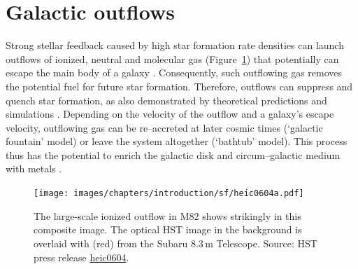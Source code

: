 
\section{Galactic outflows}
\label{introduction: section: star formation: outflows}

Strong stellar feedback caused by high star formation rate densities can launch outflows of ionized, neutral and molecular gas (Figure~\ref{introduction: figure: star formation: M82 outflow}) that potentially can escape the main body of a galaxy \citep[e.g.][]{1985Natur.317...44C}. Consequently, such outflowing gas removes the potential fuel for future star formation. Therefore, outflows can suppress and quench star formation, as also demonstrated by theoretical predictions and simulations \citep[e.g.][]{1986ApJ...303...39D,2017MNRAS.466.1213K,2018ApJ...857..116M}. Depending on the velocity of the outflow and a galaxy's escape velocity, outflowing gas can be re--accreted at later cosmic times (`galactic fountain' model) or leave the system altogether (`bathtub' model). This process thus has the potential to enrich the galactic disk and circum--galactic medium with metals \citep[e.g.][]{Oppenheimer:2006eq,2010MNRAS.406.2325O,Hopkins:2012ez,Christensen:2018ka}.

\begin{figure}
	\centering
	\texttt{[image: images/chapters/introduction/sf/heic0604a.pdf]}
	\caption[Outflows in M82]{The large-scale ionized outflow in M82 shows strikingly in this composite image. The optical HST image in the background is overlaid with \Halpha (red) from the Subaru 8.3\,m Telescope. Source: HST press release \href{https://www.spacetelescope.org/news/heic0604/}{heic0604}.}
	\label{introduction: figure: star formation: M82 outflow}
\end{figure}


